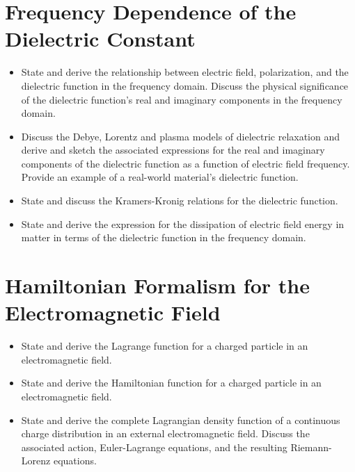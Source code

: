 \section{Frequency Dependence of the Dielectric Constant}

\begin{itemize}

    \item State and derive the relationship between electric field, polarization, and the dielectric function in the frequency domain. Discuss the physical significance of the dielectric function's real and imaginary components in the frequency domain.

    \item Discuss the Debye, Lorentz and plasma models of dielectric relaxation and derive and sketch the associated expressions for the real and imaginary components of the dielectric function as a function of electric field frequency. Provide an example of a real-world material's dielectric function.

    \item State and discuss the Kramers-Kronig relations for the dielectric function.

    \item State and derive the expression for the dissipation of electric field energy in matter in terms of the dielectric function in the frequency domain.

\end{itemize}

\section{Hamiltonian Formalism for the Electromagnetic Field}

\begin{itemize}

    \item State and derive the Lagrange function for a charged particle in an electromagnetic field.

    \item State and derive the Hamiltonian function for a charged particle in an electromagnetic field.

    \item State and derive the complete Lagrangian density function of a continuous charge distribution in an external electromagnetic field. Discuss the associated action, Euler-Lagrange equations, and the resulting Riemann-Lorenz equations.

\end{itemize}

